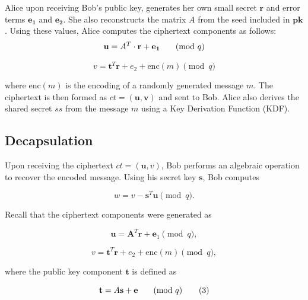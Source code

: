 \documentclass[12pt]{article}
\begin{document}
Alice upon receiving Bob's public key, generates her own small secret \( \mathbf{r} \) and error terms \(\mathbf{e_1}\) and \(\mathbf{e_2}\). She also reconstructs the matrix \(A\) from the seed included in \(\mathbf{pk}\). Using these values, Alice computes the ciphertext components as follows:
\begin{equation}
\mathbf{u} = A^T \cdot \mathbf{r} + \mathbf{e_1} \hspace{0.5cm}  \pmod{q}
\end{equation}

\begin{equation}
v = \mathbf{t}^T \mathbf{r} + e_2 + \mathrm{enc}(m) \pmod{q}
\end{equation}  

where \(\mathrm{enc}(m)\) is the encoding of a randomly generated message \(m\). The ciphertext is then formed as \(ct = (\mathbf{u}, \mathbf{v})\) and sent to Bob. Alice also derives the shared secret \(ss\) from the message \(m\) using a Key Derivation Function (KDF).

\subsection*{Decapsulation}

Upon receiving the ciphertext \( ct = (\mathbf{u}, v) \), Bob performs an algebraic operation to recover the encoded message. Using his secret key \( \mathbf{s} \), Bob computes

\begin{equation}
w = v - \mathbf{s}^T \mathbf{u} \pmod{q}.
\end{equation}

Recall that the ciphertext components were generated as

\begin{equation}
\mathbf{u} = \mathbf{A}^T \mathbf{r} + \mathbf{e}_1 \pmod{q},
\tag{4}
\end{equation}

\begin{equation}
v = \mathbf{t}^T \mathbf{r} + e_2 + \mathrm{enc}(m) \pmod{q},\tag{5}
\end{equation}

where the public key component \( \mathbf{t} \) is defined as

\begin{equation}
\mathbf{t} = A \mathbf{s} + \mathbf{e} \hspace{0.5cm}   \pmod{q}
\tag{3}
\end{equation}
\end{document}
